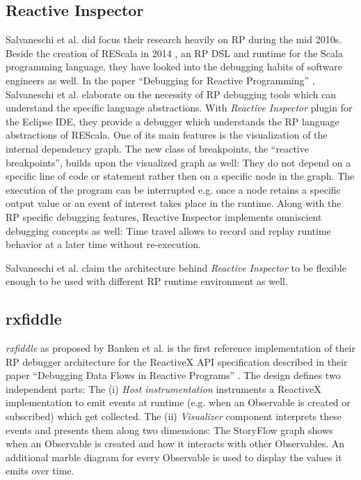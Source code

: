 \documentclass[12pt,a4paper]{article}
\begin{document}
\subsection{Reactive Inspector}

Salvaneschi et al. did focus their research heavily on RP during the mid 2010s. Beside the creation of REScala in 2014 \cite{10.1145/2577080.2577083}, an RP DSL and runtime for the Scala programming language, they have looked into the debugging habits of software engineers as well. In the paper ``Debugging for Reactive Programming'' \cite{10.1145/2884781.2884815}, Salvaneschi et al. elaborate on the necessity of RP debugging tools which can understand the specific language abstractions. With \emph{Reactive Inspector} plugin for the Eclipse IDE, they provide a debugger which understands the RP language abstractions of REScala. One of its main features is the visualization of the internal dependency graph. The new class of  breakpoints, the ``reactive breakpoints'', builds upon the visualized graph as well: They do not depend on a specific line of code or statement rather then on a specific node in the graph. The execution of the program can be interrupted e.g. once a node retains a specific output value or an event of interest takes place in the runtime. Along with the RP specific debugging features, Reactive Inspector implements omniscient debugging concepts as well: Time travel allows to record and replay runtime behavior at a later time without re-execution.

Salvaneschi et al. claim\cite{10.1145/2577080.2577083} the architecture behind \emph{Reactive Inspector} to be flexible enough to be used with different RP runtime environment as well.

\subsection{rxfiddle}

\emph{rxfiddle} as proposed by Banken et al. is the first reference implementation of their RP debugger architecture for the ReactiveX API specification described in their paper ``Debugging Data Flows in Reactive Programs'' \cite{10.1145/3180155.3180156}. The design defines two independent parts: The (i) \emph{Host instrumentation} instruments a ReactiveX implementation to emit events at runtime (e.g. when an Observable is created or subscribed) which get collected. The (ii) \emph{Visualizer} component interprets these events and presents them along two dimensions: The StoryFlow graph \cite{YWu2013a} shows when an Observable is created and how it interacts with other Observables. An additional marble diagram for every Observable is used to display the values it emits over time.
\end{document}
